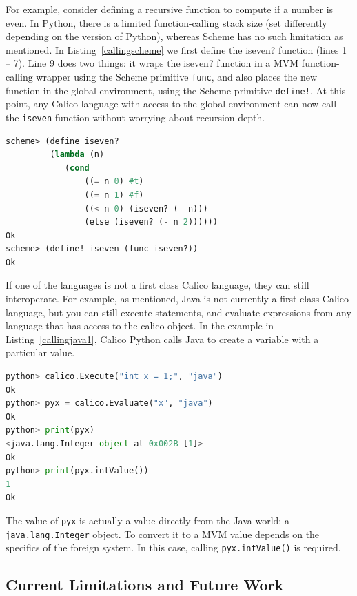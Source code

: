 \documentclass[preprint]{sigplanconf}
\begin{document}
For example, consider defining a recursive function to compute if a
number is even. In Python, there is a limited function-calling stack
size (set differently depending on the version of Python), whereas
Scheme has no such limitation as mentioned. In
Listing~\ref{callingscheme} we first define the iseven? function
(lines 1 -- 7). Line 9 does two things: it wraps the iseven? function
in a MVM function-calling wrapper using the Scheme primitive
\texttt{func}, and also places the new function in the global
environment, using the Scheme primitive \texttt{define!}. At this
point, any Calico language with access to the global environment can
now call the \texttt{iseven} function without worrying about recursion
depth.

\begin{lstlisting}[language=Lisp, keywords={define, lambda, cond, else, func, define!}, caption={Calling Scheme from Python.}, label={callingscheme}]
scheme> (define iseven?
         (lambda (n)
            (cond
                ((= n 0) #t)
                ((= n 1) #f)
                ((< n 0) (iseven? (- n)))
                (else (iseven? (- n 2))))))
Ok
scheme> (define! iseven (func iseven?))
Ok
\end{lstlisting}

If one of the languages is not a first class Calico language, they can
still interoperate. For example, as mentioned, Java is not currently a
first-class Calico language, but you can still execute statements, and
evaluate expressions from any language that has access to the calico
object. In the example in Listing~\ref{callingjava1}, Calico Python
calls Java to create a variable with a particular value.

\begin{lstlisting}[language=Python, caption={Calling Java from Python.}, label={callingjava1}]
python> calico.Execute("int x = 1;", "java")
Ok
python> pyx = calico.Evaluate("x", "java")
Ok
python> print(pyx) 
<java.lang.Integer object at 0x002B [1]>
Ok
python> print(pyx.intValue())
1
Ok
\end{lstlisting}

The value of \texttt{pyx} is actually a value directly from the Java
world: a \texttt{java.lang.Integer} object. To convert it to a MVM value
depends on the specifics of the foreign system. In this case,
calling \texttt{pyx.intValue()} is required.

\subsection{Current Limitations and Future Work}
\end{document}
